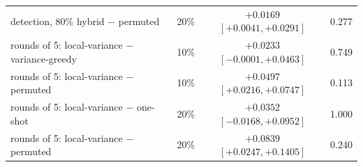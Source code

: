 \begin{tabular}{llcc}
detection, 80\% hybrid $-$ permuted & 20\% & ${+}0.0169$ $[{+}0.0041, {+}0.0291]$ & 0.277 \\
rounds of 5: local-variance $-$ variance-greedy & 10\% & ${+}0.0233$ $[-0.0001, {+}0.0463]$ & 0.749 \\
rounds of 5: local-variance $-$ permuted & 10\% & ${+}0.0497$ $[{+}0.0216, {+}0.0747]$ & 0.113 \\
rounds of 5: local-variance $-$ one-shot & 20\% & ${+}0.0352$ $[-0.0168, {+}0.0952]$ & 1.000 \\
rounds of 5: local-variance $-$ permuted & 20\% & ${+}0.0839$ $[{+}0.0247, {+}0.1405]$ & 0.240 \\
\bottomrule
\end{tabular}
